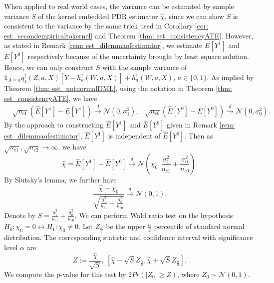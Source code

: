 When applied to real world cases, 
the variance can be estimated by sample variance $S$ of the kernel embedded PDR estimator $\widehat{\chi}$, 
since we can show $S$ is consistent to the variance by the same trick used in Corollary \ref{cor: est_secondempiricaltokernel} and Theorem \ref{thm: est_consistencyATE}. 
However, as stated in Remark \ref{rem: est_dilemmaofestimator}, 
we estimate $E[Y^1]$ and $E[Y^0]$ respectively because of the uncertainty brought by least square solution. 
Hence, we can only construct $S$ with the sample variance of $\mathds{1}_{A=a}q_1^{\dagger}(Z,a,X)[Y-h_a^{\dagger}(W,a,X)]+ h_a^{\dagger}(W, a, X)$, $a\in\{0,1\}$. 
As implied by Theorem \ref{thm: est_notnormalDML}, using the notation in Theorem \ref{thm: est_consistencyATE}, we have 
\begin{align*}
    &\sqrt{n_{c1}}(\widehat{E}[Y^1]-E[Y^1])\xrightarrow{d}\mathcal{N}(0,\sigma_1^2), & \sqrt{n_{c0}}(\widehat{E}[Y^0]-E[Y^0])\xrightarrow{d}\mathcal{N}(0,\sigma_0^2).
\end{align*}
By the approach to constructing $\widehat{E}[Y^1]$ and $\widehat{E}[Y^0]$ given in Remark \ref{rem: est_dilemmaofestimator}, 
$\widehat{E}[Y^1]$ is independent of $\widehat{E}[Y^0]$. 
Then as $\sqrt{n_{c1}},\sqrt{n_{c2}}\rightarrow\infty$, we have 
\begin{equation*}
    \widehat{\chi}=\widehat{E}[Y^1]-\widehat{E}[Y^0]\xrightarrow{d}\mathcal{N}(\chi_0,\frac{\sigma_1^2}{n_{c1}}+\frac{\sigma_0^2}{n_{c0}}).
\end{equation*}
By Slutsky's lemma, we further have 
\begin{equation*}
    \frac{\widehat{\chi}-\chi_0}{\sqrt{\frac{\widehat{\sigma}_1^2}{n_{c1}}+\frac{\widehat{\sigma}_0^2}{n_{c0}}}}\xrightarrow{d}\mathcal{N}(0,1).
\end{equation*}
Denote by $S=\frac{\widehat{\sigma}_1^2}{n_{c1}}+\frac{\widehat{\sigma}_0^2}{n_{c0}}$. 
We can perform Wald ratio test on the hypothesis $H_0: \chi_0=0\leftrightarrow H_1: \chi_0\neq 0$. 
Let $Z_{\frac{\alpha}{2}}$ be the upper $\frac{\alpha}{2}$ percentile of standard normal distribution. 
The corresponding statistic and confidence interval with significance level $\alpha$ are
\begin{equation*}
    Z:= \frac{\widehat{\chi}}{\sqrt{S}},\ [\widehat{\chi}-\sqrt{S}Z_{\frac{\alpha}{2}}, \widehat{\chi}+\sqrt{S}Z_{\frac{\alpha}{2}}]. 
\end{equation*}
We compute the p-value for this test by $2Pr(|Z_0|\geq Z)$, where $Z_0\sim\mathcal{N}(0,1)$.

